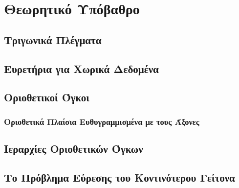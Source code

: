 \chapter{Θεωρητικό Υπόβαθρο}
\label{ch:theoretical_background}

\section{Τριγωνικά Πλέγματα}
\label{sec:triangle_meshes}

\section{Ευρετήρια για Χωρικά Δεδομένα }

\section{Οριοθετικοί Όγκοι}
\subsection{Οριοθετικά Πλαίσια Ευθυγραμμισμένα με τους Άξονες}

\section{Ιεραρχίες Οριοθετικών Όγκων}

\section{Το Πρόβλημα Εύρεσης του Κοντινότερου Γείτονα}